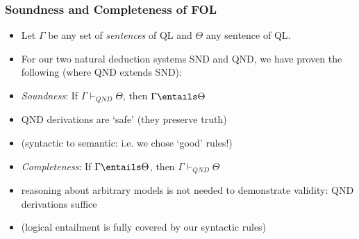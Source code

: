 \begin{frame}
\frametitle{Soundness and Completeness of FOL}

\begin{itemize}%

\item Let $\Gamma$ be any set of \textit{sentences} of QL and $\Theta$ any sentence of QL. 

\item For our two natural deduction systems SND and QND, we have proven the following (where QND extends SND):

\medskip 

\item \emph{Soundness}: If $\Gamma \vdash_{QND} \Theta$, then $\Gamma \entails \Theta$

\bi 

\item QND derivations are `safe' (they preserve truth)

\item (syntactic to semantic: i.e. we chose `good' rules!)

\ei

\bigskip 

\item \emph{Completeness}: If $\Gamma \entails \Theta$, then $\Gamma \vdash_{QND} \Theta$


\medskip 

\bi

\item reasoning about arbitrary models is not needed to demonstrate validity: QND derivations suffice

\item (logical entailment is fully covered by our syntactic rules)


\ei

\end{itemize}
\end{frame}


